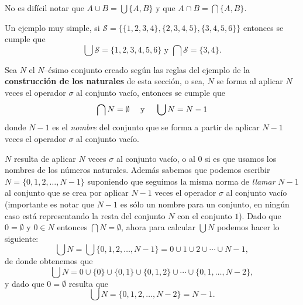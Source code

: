 No es difícil notar que $A\cup B=\bigcup\{A,B\}$ y que $A\cap B=\bigcap\{A,B\}$.

\begin{ejemplo}
Un ejemplo muy simple, si $\mathcal{S}=\{\{1,2,3,4\},\{2,3,4,5\},\{3,4,5,6\}\}$ entonces se cumple que
\[
\bigcup\mathcal{S}=\{1,2,3,4,5,6\}\text{ y }\bigcap\mathcal{S}=\{3,4\}.
\]
\end{ejemplo}

\begin{ejemplo}
Sea $N$ el $N$--ésimo conjunto creado según las reglas del ejemplo de la {\bf construcción de los naturales} de esta sección, o sea, $N$ se forma al aplicar $N$ veces el operador $\sigma$ al conjunto vacío, entonces se cumple que
\[
\bigcap N=\emptyset\text{\hspace*{10pt} y \hspace*{10pt}}\bigcup N=N-1
\]
donde $N-1$ es el \emph{nombre} del conjunto que se forma a partir de aplicar $N-1$ veces el operador $\sigma$ al conjunto vacío.

\begin{demostracion}
$N$ resulta de aplicar $N$ veces $\sigma$ al conjunto vacío, o al 0 si es que usamos los nombres de los números naturales.
Además sabemos que podemos escribir $N=\{0,1,2,\ldots,N-1\}$ suponiendo que seguimos la misma norma de \emph{llamar} $N-1$ al conjunto que se crea por aplicar $N-1$ veces el operador $\sigma$ al conjunto vacío (importante es notar que $N-1$ es sólo un nombre para un conjunto, en ningún caso está representando la resta del conjunto $N$ con el conjunto $1$).
Dado que $0=\emptyset$ y $0\in N$ entonces $\bigcap N=\emptyset$, ahora para calcular $\bigcup N$ podemos hacer lo siguiente:
\[
\bigcup N=\bigcup\{0,1,2,\ldots,N-1\}=0\cup 1\cup 2\cup\cdots\cup N-1,
\]
de donde obtenemos que
\[
\bigcup N=0\cup\{0\}\cup\{0,1\}\cup\{0,1,2\}\cup\cdots\cup\{0,1,\ldots,N-2\},
\]
y dado que $0=\emptyset$ resulta que
\[
\bigcup N=\{0,1,2,\ldots,N-2\}=N-1.
\]
\end{demostracion}
\end{ejemplo}